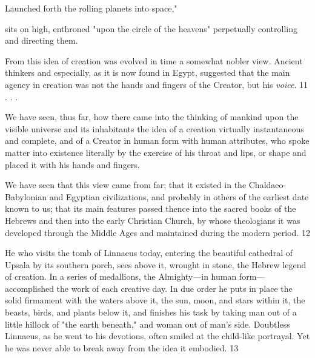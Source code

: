 Launched forth the rolling planets into space,"

sits on high, enthroned "upon the circle of the heavens" perpetually controlling and directing
them.

From this idea of creation was evolved in time a somewhat nobler view. Ancient thinkers and
especially, as it is now found in Egypt, suggested that the main agency in creation was not
the hands and fingers of the Creator, but his \textit{voice}. 11 . . .

We have seen, thus far, how there came into the thinking of mankind upon the visible
universe and its inhabitants the idea of a creation virtually instantaneous and complete, and
of a Creator in human form with human attributes, who spoke matter into existence literally
by the exercise of his throat and lips, or shape and placed it with his hands and fingers.

We have seen that this view came from far; that it existed in the Chaldaeo-Babylonian and
Egyptian civilizations, and probably in others of the earliest date known to us; that its main
features passed thence into the sacred books of the Hebrews and then into the early Christian
Church, by whose theologians it was developed through the Middle Ages and maintained
during the modern period. 12

He who visits the tomb of Linnaeus today, entering the beautiful cathedral of Upsala by its
southern porch, sees above it, wrought in stone, the Hebrew legend of creation. In a series of
medallions, the Almighty—in human form—accomplished the work of each creative day. In
due order he puts in place the solid firmament with the waters above it, the sun, moon, and
stars within it, the beasts, birds, and plants below it, and finishes his task by taking man out
of a little hillock of "the earth beneath," and woman out of man's side. Doubtless Linnaeus,
as he went to his devotions, often smiled at the child-like portrayal. Yet he was never able to
break away from the idea it embodied. 13

